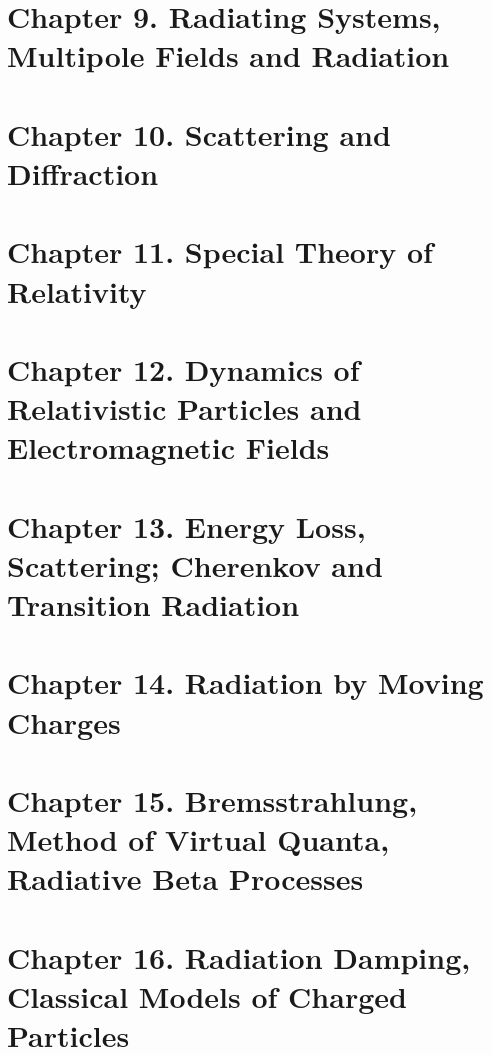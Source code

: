 \documentclass[11pt]{article}
\begin{document}
\section{Chapter 9. Radiating Systems, Multipole Fields and Radiation}

\clearpage
\section{Chapter 10. Scattering and Diffraction}

\clearpage
\section{Chapter 11. Special Theory of Relativity}

\clearpage
\section{Chapter 12. Dynamics of Relativistic Particles and Electromagnetic Fields}

\clearpage
\section{Chapter 13. Energy Loss, Scattering; Cherenkov and Transition Radiation}

\clearpage
\section{Chapter 14. Radiation by Moving Charges}

\clearpage
\section{Chapter 15. Bremsstrahlung, Method of Virtual Quanta, Radiative Beta Processes}

\clearpage
\section{Chapter 16. Radiation Damping, Classical Models of Charged Particles}

\end{document}
